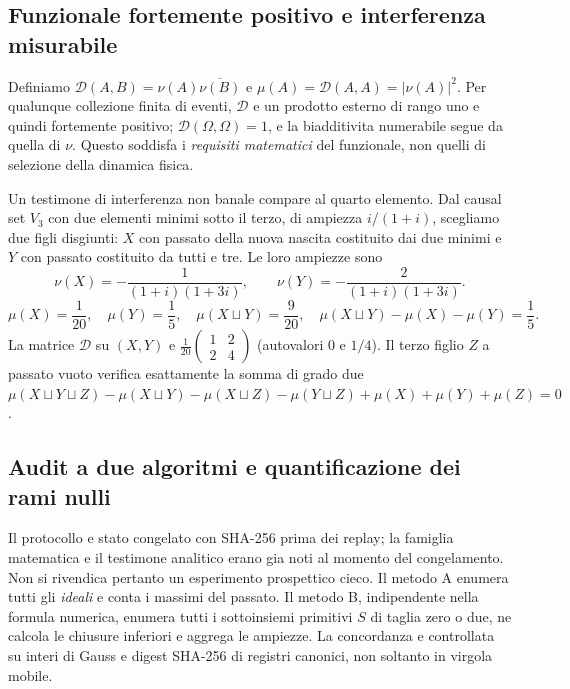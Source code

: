 \documentclass[11pt,a4paper]{article}
\begin{document}
\subsection*{Funzionale fortemente positivo e interferenza misurabile}
Definiamo $\mathcal D(A,B)=\nu(A)\overline{\nu(B)}$ e $\mu(A)=\mathcal D(A,A)=|\nu(A)|^2$. Per qualunque collezione finita di eventi, $\mathcal D$ e un prodotto esterno di rango uno e quindi fortemente positivo; $\mathcal D(\Omega,\Omega)=1$, e la biadditivita numerabile segue da quella di $\nu$. Questo soddisfa i \emph{requisiti matematici} del funzionale, non quelli di selezione della dinamica fisica.

Un testimone di interferenza non banale compare al quarto elemento. Dal causal set $V_3$ con due elementi minimi sotto il terzo, di ampiezza $i/(1+i)$, scegliamo due figli disgiunti: $X$ con passato della nuova nascita costituito dai due minimi e $Y$ con passato costituito da tutti e tre. Le loro ampiezze sono
\begin{equation}
 \nu(X)=-\frac1{(1+i)(1+3i)},\qquad
 \nu(Y)=-\frac2{(1+i)(1+3i)}.\tag{CX.6}
\end{equation}
\begin{equation}
 \boxed{\mu(X)=\frac1{20},\quad\mu(Y)=\frac15,\quad
 \mu(X\sqcup Y)=\frac9{20},\quad
 \mu(X\sqcup Y)-\mu(X)-\mu(Y)=\frac15.}\tag{CX.7}
\end{equation}
La matrice $\mathcal D$ su $(X,Y)$ e $\frac1{20}\begin{pmatrix}1&2\\2&4\end{pmatrix}$ (autovalori $0$ e $1/4$). Il terzo figlio $Z$ a passato vuoto verifica esattamente la somma di grado due
$\mu(X\sqcup Y\sqcup Z)-\mu(X\sqcup Y)-\mu(X\sqcup Z)-\mu(Y\sqcup Z)+\mu(X)+\mu(Y)+\mu(Z)=0$.

\clearpage
\subsection*{Audit a due algoritmi e quantificazione dei rami nulli}
Il protocollo e stato congelato con SHA-256 prima dei replay; la famiglia matematica e il testimone analitico erano gia noti al momento del congelamento. Non si rivendica pertanto un esperimento prospettico cieco. Il metodo A enumera tutti gli \emph{ideali} e conta i massimi del passato. Il metodo B, indipendente nella formula numerica, enumera tutti i sottoinsiemi primitivi $S$ di taglia zero o due, ne calcola le chiusure inferiori e aggrega le ampiezze. La concordanza e controllata su interi di Gauss e digest SHA-256 di registri canonici, non soltanto in virgola mobile.
\end{document}
